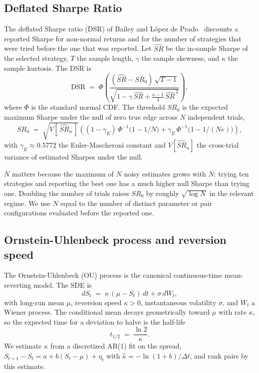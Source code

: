 \documentclass[11pt]{article}
\begin{document}
\subsection{Deflated Sharpe Ratio}
\label{app:dsr}

The deflated Sharpe ratio (DSR) of Bailey and L\'opez de Prado~\cite{bailey2014dsr}
discounts a reported Sharpe for non-normal returns and for the number of strategies that
were tried before the one that was reported. Let $\widehat{SR}$ be the in-sample Sharpe of
the selected strategy, $T$ the sample length, $\gamma$ the sample skewness, and $\kappa$
the sample kurtosis. The DSR is
\[
\mathrm{DSR} \;=\; \Phi\!\left( \frac{ (\widehat{SR} - SR_0) \, \sqrt{T - 1} }
    { \sqrt{1 - \gamma \, \widehat{SR} + \tfrac{\kappa - 1}{4} \, \widehat{SR}^{\,2} } } \right),
\]
where $\Phi$ is the standard normal CDF. The threshold $SR_0$ is the expected maximum
Sharpe under the null of zero true edge across $N$ independent trials,
\[
SR_0 \;=\; \sqrt{V[\,\widehat{SR}_n\,]} \left( (1 - \gamma_E) \, \Phi^{-1}\!\big(1 - 1/N\big)
    + \gamma_E \, \Phi^{-1}\!\big(1 - 1/(N e)\big) \right),
\]
with $\gamma_E \approx 0.5772$ the Euler-Mascheroni constant and $V[\widehat{SR}_n]$ the
cross-trial variance of estimated Sharpes under the null.

$N$ matters because the maximum of $N$ noisy estimates grows with $N$: trying ten
strategies and reporting the best one has a much higher null Sharpe than trying one.
Doubling the number of trials raises $SR_0$ by roughly $\sqrt{\log N}$ in the relevant
regime. We use $N$ equal to the number of distinct parameter or pair configurations
evaluated before the reported one.

\subsection{Ornstein-Uhlenbeck process and reversion speed}
\label{app:ou}

The Ornstein-Uhlenbeck (OU) process is the canonical continuous-time mean-reverting model.
The SDE is
\[
dS_t \;=\; \kappa \, (\mu - S_t) \, dt + \sigma \, dW_t,
\]
with long-run mean $\mu$, reversion speed $\kappa > 0$, instantaneous volatility $\sigma$,
and $W_t$ a Wiener process. The conditional mean decays geometrically toward $\mu$ with
rate $\kappa$, so the expected time for a deviation to halve is the half-life
\[
t_{1/2} \;=\; \frac{\ln 2}{\kappa}.
\]
We estimate $\kappa$ from a discretized AR(1) fit on the spread,
$S_{t+1} - S_t = a + b (S_t - \mu) + \eta_t$ with $\hat{\kappa} = -\ln(1 + b) / \Delta t$,
and rank pairs by this estimate.
\end{document}
